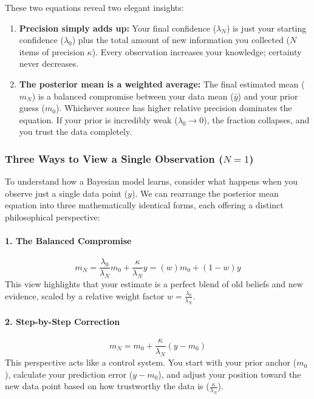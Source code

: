 \documentclass{article}
\begin{document}
These two equations reveal two elegant insights:
\begin{enumerate}
    \item \textbf{Precision simply adds up:} Your final confidence ($\lambda_N$) is just your starting confidence ($\lambda_0$) plus the total amount of new information you collected ($N$ items of precision $\kappa$). Every observation increases your knowledge; certainty never decreases.
    \item \textbf{The posterior mean is a weighted average:} The final estimated mean ($m_N$) is a balanced compromise between your data mean ($\bar{y}$) and your prior guess ($m_0$). Whichever source has higher relative precision dominates the equation. If your prior is incredibly weak ($\lambda_0 \to 0$), the fraction collapses, and you trust the data completely.
\end{enumerate}

\subsubsection{Three Ways to View a Single Observation ($N=1$)}
To understand how a Bayesian model learns, consider what happens when you observe just a single data point ($y$). We can rearrange the posterior mean equation into three mathematically identical forms, each offering a distinct philosophical perspective:

\paragraph{1. The Balanced Compromise}
\begin{equation}
m_N = \frac{\lambda_0}{\lambda_N}m_0 + \frac{\kappa}{\lambda_N}y = (w)m_0 + (1-w)y
\end{equation}
This view highlights that your estimate is a perfect blend of old beliefs and new evidence, scaled by a relative weight factor $w = \frac{\lambda_0}{\lambda_N}$.

\paragraph{2. Step-by-Step Correction}
\begin{equation}
m_N = m_0 + \frac{\kappa}{\lambda_N}(y - m_0)
\end{equation}
This perspective acts like a control system. You start with your prior anchor ($m_0$), calculate your prediction error ($y - m_0$), and adjust your position toward the new data point based on how trustworthy the data is ($\frac{\kappa}{\lambda_N}$).
\end{document}
